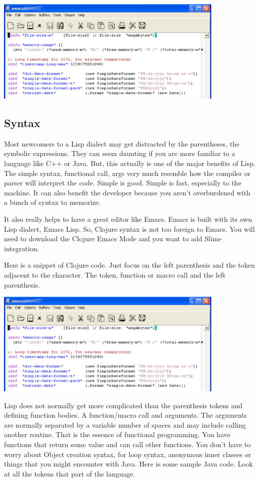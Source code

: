 \includegraphics[width=110mm]{emacs_2.eps}

\subsection{Syntax}

Most newcomers to a Lisp dialect may get distracted by the parentheses, the symbolic expressions. They can seem daunting if you are more familiar to a language like C++ or Java. But, this actually is one of the major benefits of Lisp. The simple syntax, functional call, args very much resemble how the compiler or parser will interpret the code. Simple is good. Simple is fast, especially to the machine. It can also benefit the developer because you aren't overburdened with a bunch of syntax to memorize.

It also really helps to have a great editor like Emacs. Emacs is built with its own Lisp dialect, Emacs Lisp. So, Clojure syntax is not too foreign to Emacs. You will need to download the Clojure Emacs Mode and you want to add Slime integration.

Here is a snippet of Clojure code. Just focus on the left parenthesis and the token adjacent to the character. The token, function or macro call and the left parenthesis.

\includegraphics[width=110mm]{emacs_2.eps}

Lisp does not normally get more complicated than the parenthesis tokens and defining function bodies. A function/macro call and arguments. The arguments are normally separated by a variable number of spaces and may include calling another routine. That is the essence of functional programming. You have functions that return some value and can call other functions. You don't have to worry about Object creation syntax, for loop syntax, anonymous inner classes or things that you might encounter with Java. Here is some sample Java code. Look at all the tokens that part of the language.

